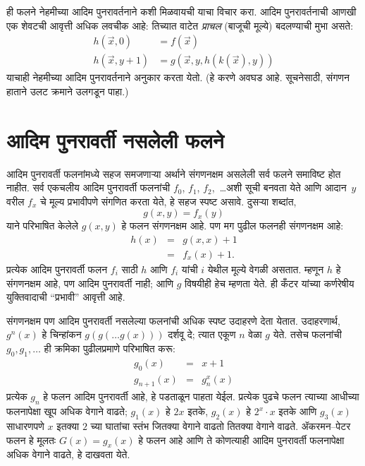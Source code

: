 ही फलने नेहमीच्या आदिम पुनरावर्तनाने कशी मिळवायची याचा विचार करा. आदिम
पुनरावर्तनाची आणखी एक शेवटची आवृत्ती अधिक लवचीक आहे: तिच्यात वाटेत
\emph{प्राचल} (बाजूची मूल्ये) बदलण्याची मुभा असते:
\begin{align*}
h(\vec x, 0) & = f(\vec x) \\
h(\vec x, y+1) & = g(\vec x, y, h(k(\vec x), y))
\end{align*}
याचाही नेहमीच्या आदिम पुनरावर्तनाने अनुकार करता येतो. (हे करणे अवघड आहे.
सूचनेसाठी, संगणन हाताने उलट क्रमाने उलगडून पाहा.)











\section{आदिम पुनरावर्ती नसलेली फलने}\label{cmp:rec:npr:sec}

आदिम पुनरावर्ती फलनांमध्ये सहज समजणाऱ्या अर्थाने संगणनक्षम असलेली सर्व
फलने समाविष्ट होत नाहीत. सर्व एकचलीय आदिम पुनरावर्ती फलनांची $f_0$,
$f_1$, $f_2$,~\dots अशी सूची बनवता येते आणि आदान~$y$ वरील $f_x$ चे मूल्य
प्रभावीपणे संगणित करता येते, हे सहज स्पष्ट असावे. दुसऱ्या शब्दांत,
\[g(x,y) = f_x(y)
\]
याने परिभाषित केलेले $g(x,y)$ हे फलन संगणनक्षम आहे. पण मग पुढील फलनही
संगणनक्षम आहे:
\begin{eqnarray*}
h(x) & = & g(x,x) + 1 \\
& = & f_x(x) +1.
\end{eqnarray*}
प्रत्येक आदिम पुनरावर्ती फलन $f_i$ साठी $h$ आणि $f_i$ यांची $i$ येथील
मूल्ये वेगळी असतात. म्हणून $h$ हे संगणनक्षम आहे, पण आदिम पुनरावर्ती नाही;
आणि $g$ विषयीही हेच म्हणता येते. ही कँटर यांच्या कर्णरेषीय युक्तिवादाची
``प्रभावी'' आवृत्ती आहे.

संगणनक्षम पण आदिम पुनरावर्ती नसलेल्या फलनांची अधिक स्पष्ट उदाहरणे देता
येतात. उदाहरणार्थ, $g^n(x)$ हे चिन्हांकन $g(g(\dots g(x)))$ दर्शवू दे;
त्यात एकूण $n$ वेळा $g$ येते. तसेच फलनांची $g_0,g_1,\dots$ ही क्रमिका
पुढीलप्रमाणे परिभाषित करू:
\begin{eqnarray*}
g_0(x) & = & x+1 \\
g_{n + 1}(x) & = & g_n^x(x)
\end{eqnarray*}
प्रत्येक $g_n$ हे फलन आदिम पुनरावर्ती आहे, हे पडताळून पाहता येईल. प्रत्येक
पुढचे फलन त्याच्या आधीच्या फलनापेक्षा खूप अधिक वेगाने वाढते; $g_1(x)$ हे
$2x$ इतके, $g_2(x)$ हे $2^x \cdot x$ इतके आणि $g_3(x)$ साधारणपणे $x$
इतक्या $2$ च्या घातांचा स्तंभ जितक्या वेगाने वाढतो तितक्या वेगाने वाढते.
ॲकरमन--पेटर फलन हे मूलतः $G(x) = g_x(x)$ हे फलन आहे आणि ते कोणत्याही
आदिम पुनरावर्ती फलनापेक्षा अधिक वेगाने वाढते, हे दाखवता येते.

